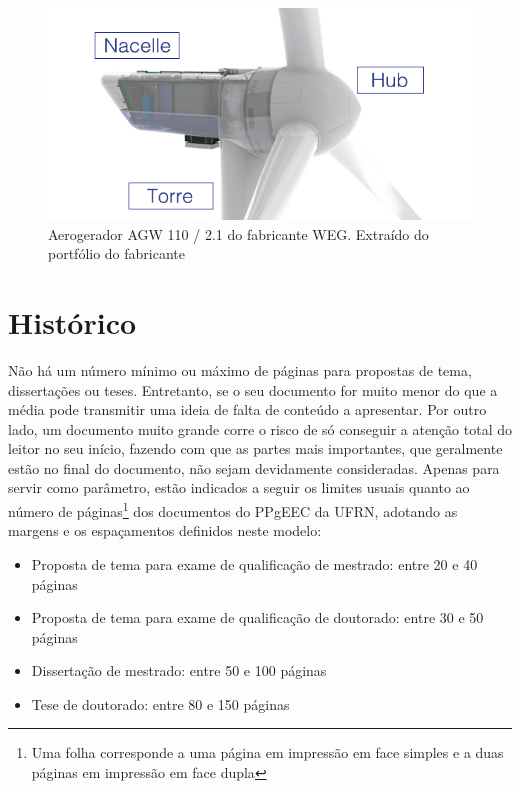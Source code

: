 \begin{figure}[htbp!] \begin{center}
\includegraphics[width=0.75\linewidth]{./figuras/Aero-weg}
\caption{Aerogerador AGW 110 / 2.1 do fabricante WEG. Extraído do portfólio do fabricante}
\label{Fig:ilustracaoAerogerador}
\end{center} 
\end{figure}

\section{Histórico}
\label{Sec:historico}


Não há um número mínimo ou máximo de páginas para propostas de tema,
dissertações ou teses. Entretanto, se o seu documento for muito menor
do que a média pode transmitir uma ideia de falta de conteúdo a
apresentar. Por outro lado, um documento muito grande corre o risco de
só conseguir a atenção total do leitor no seu início, fazendo com que
as partes mais importantes, que geralmente estão no final do
documento, não sejam devidamente consideradas. Apenas para servir como
parâmetro, estão indicados a seguir os limites usuais quanto ao número
de páginas\footnote{Uma folha corresponde a uma página em impressão em
face simples e a duas páginas em impressão em face dupla} dos
documentos do PPgEEC da UFRN, adotando as margens e os espaçamentos
definidos neste modelo:
\begin{itemize}
\item Proposta de tema para exame de qualificação de mestrado:
entre 20 e 40 páginas
\item Proposta de tema para exame de qualificação de doutorado:
entre 30 e 50 páginas
\item Dissertação de mestrado:
entre 50 e 100 páginas
\item Tese de doutorado:
entre 80 e 150 páginas
\end{itemize}

